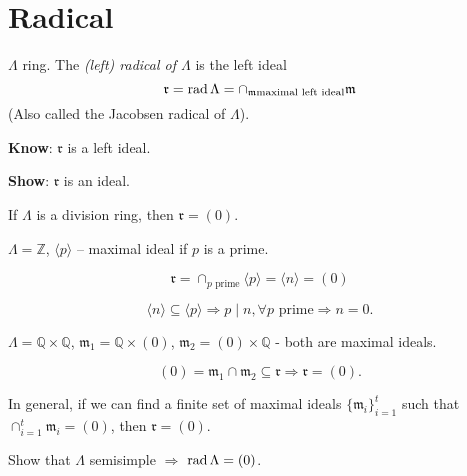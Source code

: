 \section{Radical}

\begin{defin}
$\Lambda$ ring.  The \emph{(left) radical of $\Lambda$} is the left ideal
\[\mathfrak{r} = \operatorname{rad}\nolimits \Lambda = \cap_{\mathfrak{m} \text{maximal left ideal}} \mathfrak{m}\]
(Also called the Jacobsen radical of $\Lambda$).
\end{defin}

\textbf{Know}: $\mathfrak{r}$ is a left ideal.

\textbf{Show}: $\mathfrak{r}$ is an ideal.

\begin{exam}
If $\Lambda$ is a division ring, then $\mathfrak{r} = (0)$. 
\end{exam} 

\begin{exam}
$\Lambda = \mathbb{Z}$, $\langle p\rangle$ -- maximal ideal if $p$ is
a prime.

\[\mathfrak{r} = \cap_{p \text{\ prime}} \langle p\rangle = \langle
n\rangle = (0)\]

\[\langle n\rangle \subseteq \langle p\rangle \Rightarrow p\mid n,
\forall p \text{\ prime} \Rightarrow n = 0.\]
\end{exam}

\begin{exam}
$\Lambda = \mathbb{Q}\times \mathbb{Q}$, $\mathfrak{m}_1 =
\mathbb{Q}\times (0)$, $\mathfrak{m}_2 = (0)\times\mathbb{Q}$ - both are
maximal ideals.

\[(0) = \mathfrak{m}_1 \cap \mathfrak{m}_2 \subseteq \mathfrak{r}
  \Rightarrow \mathfrak{r} = (0).\] 
\end{exam}
In general, if we can find a finite set of maximal ideals
$\{\mathfrak{m}_i\}_{i=1}^t$ such that $\cap_{i=1}^t \mathfrak{m}_i =
(0)$, then $\mathfrak{r} = (0)$. 

\begin{exer}
Show that $\Lambda$ semisimple $\Rightarrow$ $\operatorname{rad}\nolimits\Lambda = (0)$.
\end{exer}

